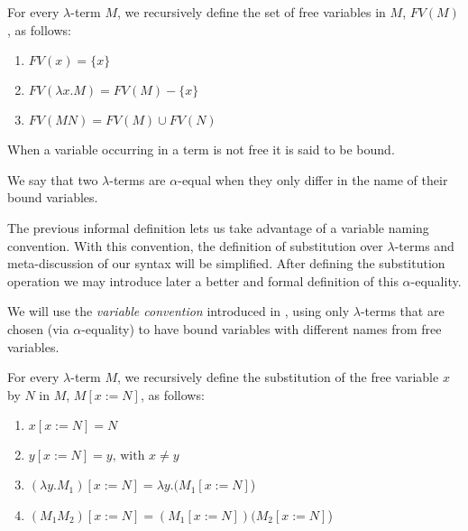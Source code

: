 \begin{definition}
  For every $\lambda$-term $M$, we recursively define the set of free variables in $M$, $FV(M)$, as follows:
  
  \begin{enumerate}
  \item $FV( x ) = \{ x \}$
  \item $FV( \lambda x . M ) = FV(M) - \{ x \}$
  \item $FV( M N ) = FV(M) \cup FV(N)$
  \end{enumerate}

  When a variable occurring in a term is not free it is said to be bound.
\end{definition}


\begin{definition}
  We say that two $\lambda$-terms are $\alpha$-equal when they only differ in the name of their bound variables.
\end{definition}

\begin{remark}
  The previous informal definition lets us take advantage of a variable naming convention.
  With this convention, the definition of substitution over $\lambda$-terms and meta-discussion of our syntax will be simplified.
  After defining the substitution operation we may introduce later a better and formal definition of this $\alpha$-equality.
\end{remark}

\begin{convention} 
  We will use the \textit{variable convention} introduced in \cite{Barendregt1987}, using only $\lambda$-terms that are chosen (via $\alpha$-equality) to have bound variables with different names from free variables.
\end{convention}

\begin{definition}[Substitution]
  For every $\lambda$-term $M$, we recursively define the substitution of the free variable $x$ by $N$ in $M$, $M[x := N]$, as follows:
  
  \begin{enumerate}
  \item $x[x := N] = N$
  \item $y[x := N] = y \text{, with } x \neq y$
  \item $(\lambda y . M_1)[x := N] = \lambda y . (M_1[x := N]$)
  \item $(M_1 M_2)[x := N] = (M_1[x := N]) (M_2[x := N]$)
  \end{enumerate}
\end{definition}

